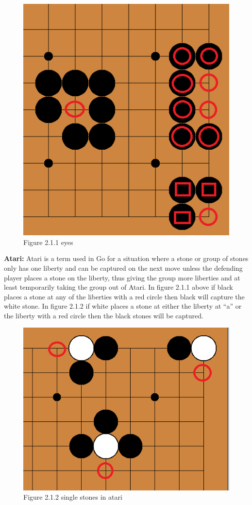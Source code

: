 \documentclass{l3proj}
\begin{document}
\begin{figure}[H]
\centering
\includegraphics[scale=0.5]{Images/eyes.png}
\caption{Figure 2.1.1 eyes}
\end{figure}

\textbf{Atari:} Atari is a term used in Go for a situation where a stone or group of stones only has one liberty and can be captured on the next move unless the defending player places a stone on the liberty, thus giving the group more liberties and at least temporarily taking the group out of Atari. In figure 2.1.1 above if black places a stone at any of the liberties with a red circle then black will capture the white stone. In figure 2.1.2 if white places a stone at either the liberty at “a” or the liberty with a red circle then the black stones will be captured.

\begin{figure}[H]
\centering
\includegraphics[scale=0.5]{Images/singlestonesinatari.png}
\caption{Figure 2.1.2 single stones in atari}
\end{figure}
\end{document}
